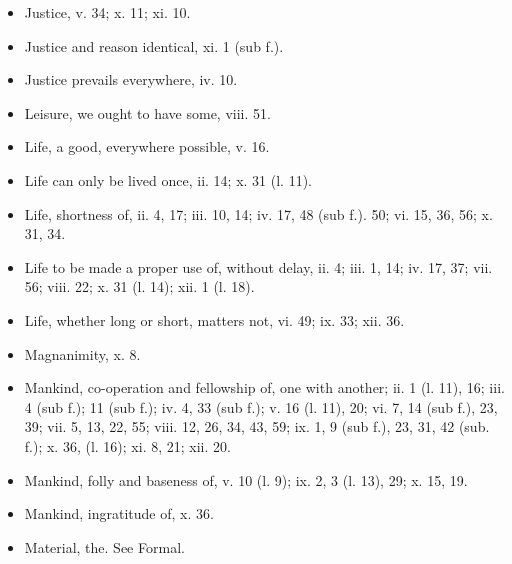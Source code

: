 \begin{itemize}[leftmargin=*]
\setlength\itemsep{0em}
\item
  Justice, v. 34; x. 11; xi. 10.
\item
  Justice and reason identical, xi. 1 (sub f.).
\item
  Justice prevails everywhere, iv. 10.
\end{itemize}

\begin{itemize}[leftmargin=*]
\setlength\itemsep{0em}
\item
  Leisure, we ought to have some, viii. 51.
\item
  Life, a good, everywhere possible, v. 16.
\item
  Life can only be lived once, ii. 14; x. 31 (l. 11).
\item
  Life, shortness of, ii. 4, 17; iii. 10, 14; iv. 17, 48 (sub f.). 50;
  vi. 15, 36, 56; x. 31, 34.
\item
  Life to be made a proper use of, without delay, ii. 4; iii. 1, 14; iv.
  17, 37; vii. 56; viii. 22; x. 31 (l. 14); xii. 1 (l. 18).
\item
  Life, whether long or short, matters not, vi. 49; ix. 33; xii. 36.
\end{itemize}

\begin{itemize}[leftmargin=*]
\setlength\itemsep{0em}
\item
  Magnanimity, x. 8.
\item
  Mankind, co-operation and fellowship of, one with another; ii. 1 (l.
  11), 16; iii. 4 (sub f.); 11 (sub f.); iv. 4, 33 (sub f.); v. 16 (l.
  11), 20; vi. 7, 14 (sub f.), 23, 39; vii. 5, 13, 22, 55; viii. 12, 26,
  34, 43, 59; ix. 1, 9 (sub f.), 23, 31, 42 (sub. f.); x. 36, (l. 16);
  xi. 8, 21; xii. 20.
\item
  Mankind, folly and baseness of, v. 10 (l. 9); ix. 2, 3 (l. 13), 29; x.
  15, 19.
\item
  Mankind, ingratitude of, x. 36.
\item
  Material, the. See Formal.
\end{itemize}

